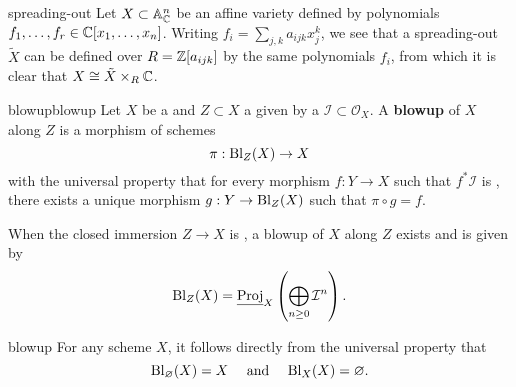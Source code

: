 \begin{example}{spreading-out}
    Let $X \subset \mathbb{A}^n_{\mathbb{C}}$ be an affine variety defined by polynomials $f_1, \ldots, f_r \in \mathbb{C}[x_1, \ldots, x_n]$. Writing $f_i = \sum_{j, k} a_{ijk} x_j^k$, we see that a spreading-out $\tilde{X}$ can be defined over $R = \mathbb{Z}[a_{ijk}]$ by the same polynomials $f_i$, from which it is clear that $X \cong \tilde{X} \times_R \mathbb{C}$.
\end{example}


\begin{topic}{blowup}{blowup}
    Let $X$ be a  and $Z \subset X$ a  given by a  $\mathcal{I} \subset \mathcal{O}_X$. A \textbf{blowup} of $X$ along $Z$ is a morphism of schemes
    \[ \pi : \textup{Bl}_Z(X) \to X \]
    with the universal property that for every morphism $f : Y \to X$ such that $f^* \mathcal{I}$ is , there exists a unique morphism $g : Y \to \textup{Bl}_Z(X)$ such that $\pi \circ g = f$.

    When the closed immersion $Z \to X$ is , a blowup of $X$ along $Z$ exists and is given by
    \[ \textup{Bl}_Z(X) = \underline{\operatorname{Proj}}_X \left( \bigoplus_{n \ge 0} \mathcal{I}^n \right) . \]
\end{topic}

\begin{example}{blowup}
    For any scheme $X$, it follows directly from the universal property that
    \[ \textup{Bl}_\varnothing(X) = X \quad \textup{ and } \quad \textup{Bl}_X(X) = \varnothing . \]
\end{example}

